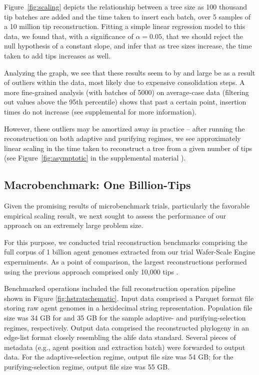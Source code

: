 Figure~\ref{fig:scaling} depicts the relationship between a tree size as 100 thousand tip batches are added and the time taken to insert each batch, over 5 samples of a 10 million tip reconstruction. 
Fitting a simple linear regression model to this data, we found that, with a significance of $\alpha = 0.05$, that we should reject the null hypothesis of a constant slope, and infer that as tree sizes increase, the time taken to add tips increases as well.

Analyzing the graph, we see that these results seem to by and large be as a result of outliers within the data, most likely due to expensive consolidation steps. A more fine-grained analysis (with batches of 5000) on average-case data (filtering out values above the 95th percentile) shows that past a certain point, insertion times do not increase (see supplemental \citep{supplemental} for more information).

However, these outliers may be amortized away in practice -- after running the reconstruction on both adaptive and purifying regimes, we see approximately linear scaling in the time taken to reconstruct a tree from a given number of tips (see Figure~\ref{fig:asymptotic} in the supplemental material \citep{supplemental}).

\subsection{Macrobenchmark: One Billion-Tips}



Given the promising results of microbenchmark trials, particularly the favorable empirical scaling result, we next sought to assess the performance of our approach on an extremely large problem size.

For this purpose, we conducted trial reconstruction benchmarks comprising the full corpus of 1 billion agent genomes extracted from our trial Wafer-Scale Engine expermiments.
As a point of comparison, the largest reconstructions performed using the previous approach comprised only 10,000 tips \citep{moreno2024trackable}.

Benchmarked operations included the full reconstruction operation pipeline shown in Figure \ref{fig:hstratschematic}.
Input data comprised a Parquet format file storing raw agent genomes in a hexidecimal string representation.
Population file size was 34 GB for and 35 GB for the sample adaptive- and purifying-selection regimes, respectively.
Output data comprised the reconstructed phylogeny in an edge-list format closely resembling the alife data standard.
Several pieces of metadata (e.g., agent position and extraction batch) were forwarded to output data.
For the adaptive-selection regime, output file size was 54 GB;
for the purifying-selection regime, output file size was 55 GB.

